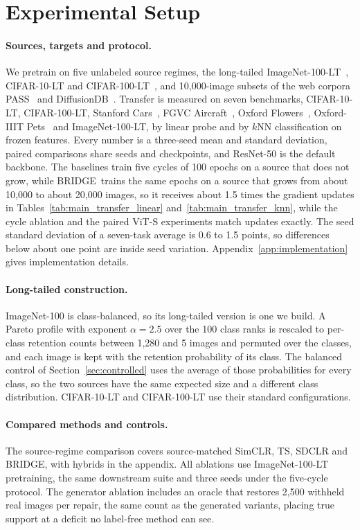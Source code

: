 \documentclass{article}
\newcommand{\method}{BRIDGE}
\begin{document}
\section{Experimental Setup}
\label{sec:setup}
\paragraph{Sources, targets and protocol.}
We pretrain on five unlabeled source regimes, the long-tailed ImageNet-100-LT~\citep{imagenet-lt}, CIFAR-10-LT and CIFAR-100-LT~\citep{krizhevsky2009learning}, and 10{,}000-image subsets of the web corpora PASS~\citep{pass} and DiffusionDB~\citep{diffusiondb}. Transfer is measured on seven benchmarks, CIFAR-10-LT, CIFAR-100-LT, Stanford Cars~\citep{cars}, FGVC Aircraft~\citep{aircraft}, Oxford Flowers~\citep{flowers}, Oxford-IIIT Pets~\citep{pets} and ImageNet-100-LT, by linear probe and by $k$NN classification on frozen features. Every number is a three-seed mean and standard deviation, paired comparisons share seeds and checkpoints, and ResNet-50 is the default backbone. The baselines train five cycles of 100 epochs on a source that does not grow, while \method\ trains the same epochs on a source that grows from about 10{,}000 to about 20{,}000 images, so it receives about 1.5 times the gradient updates in Tables~\ref{tab:main_transfer_linear} and~\ref{tab:main_transfer_knn}, while the cycle ablation and the paired ViT-S experiments match updates exactly. The seed standard deviation of a seven-task average is 0.6 to 1.5 points, so differences below about one point are inside seed variation. Appendix~\ref{app:implementation} gives implementation details.

\paragraph{Long-tailed construction.}
ImageNet-100 is class-balanced, so its long-tailed version is one we build. A Pareto profile with exponent $\alpha=2.5$ over the 100 class ranks is rescaled to per-class retention counts between 1{,}280 and 5 images and permuted over the classes, and each image is kept with the retention probability of its class. The balanced control of Section~\ref{sec:controlled} uses the average of those probabilities for every class, so the two sources have the same expected size and a different class distribution. CIFAR-10-LT and CIFAR-100-LT use their standard configurations.

\paragraph{Compared methods and controls.}
The source-regime comparison covers source-matched SimCLR, TS, SDCLR and \method, with hybrids in the appendix. All ablations use ImageNet-100-LT pretraining, the same downstream suite and three seeds under the five-cycle protocol. The generator ablation includes an oracle that restores 2{,}500 withheld real images per repair, the same count as the generated variants, placing true support at a deficit no label-free method can see.
\end{document}
